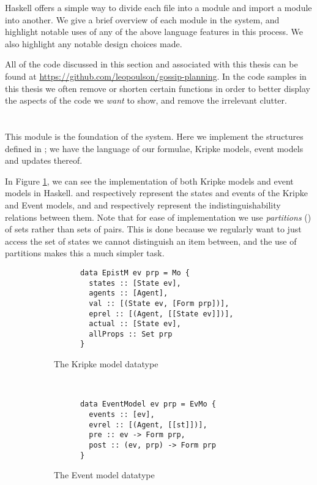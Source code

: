 \documentclass[10pt, a4paper]{report}
\begin{document}
Haskell offers a simple way to divide each file into a module and import a
module into another. We give a brief overview of each module in the system, and
highlight notable uses of any of the above language features in this process. We
also highlight any notable design choices made.

All of the code discussed in this section and associated with this thesis can be
found at \url{https://github.com/leopoulson/gossip-planning}. In the code
samples in this thesis we often remove or shorten certain functions in order to
better display the aspects of the code we \emph{want} to show, and remove the
irrelevant clutter. 

\section{}

This module is the foundation of the system. Here we implement the structures
defined in ; we have the language of our formulae, Kripke
models, event models and updates thereof.

In Figure \ref{fig:HaskellModels}, we can see the implementation of both Kripke
models and event models in Haskell.  and 
respectively represent the states and events of the Kripke and Event models, and
 and  respectively represent the
indistinguishability relations between them. Note that for ease of
implementation we use \emph{partitions} (\cite{EREL}) of sets rather than sets
of pairs. This is done because we regularly want to just access the set of
states we cannot distinguish an item between, and the use of partitions makes
this a much simpler task. 

\begin{figure}[h]
  \centering
  \begin{subfigure}[b]{0.5\textwidth}
    \begin{verbatim}
      data EpistM ev prp = Mo {
        states :: [State ev],                  
        agents :: [Agent],              
        val :: [(State ev, [Form prp])],         
        eprel :: [(Agent, [[State ev]])],
        actual :: [State ev],              
        allProps :: Set prp
      }
    \end{verbatim}
    \caption{The Kripke model datatype}
  \end{subfigure}%
~
  \begin{subfigure}[b]{0.5\textwidth}
    \begin{verbatim}
      data EventModel ev prp = EvMo {
        events :: [ev],
        evrel :: [(Agent, [[st]])],
        pre :: ev -> Form prp,
        post :: (ev, prp) -> Form prp
      }
    \end{verbatim}
    \caption{The Event model datatype}
  \end{subfigure}
  \caption{}
  \label{fig:HaskellModels}
\end{figure}
\end{document}
